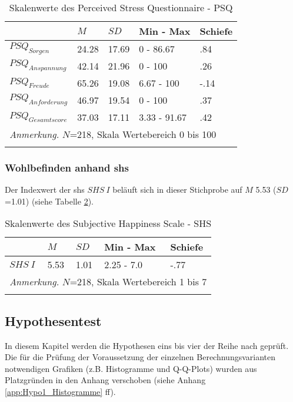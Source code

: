 \begin{table}[ht]
\begin{tabular}{m{6em} m{3em}  m{3em}  m{5em} m{3em}} 
  \hline
  & $M$ & $SD$ & Min - Max & Schiefe\\
  \hline
  $PSQ_{Sorgen}$ & 24.28 & 17.69 & 0 - 86.67 & .84 \\
  $PSQ_{Anspannung}$ & 42.14 & 21.96 & 0 - 100 & .26\\
  $PSQ_{Freude}$ & 65.26 & 19.08 & 6.67 - 100 & -.14\\
  $PSQ_{Anforderung}$ & 46.97 & 19.54 & 0 - 100 & .37 \\
  $PSQ_{Gesamtscore}$ & 37.03 & 17.11 & 3.33 - 91.67 & .42\\
  \hline
  \multicolumn{5}{l}{\textit{Anmerkung.} $N$=218, Skala Wertebereich 0 bis 100}\\
  &&&&\\
\end{tabular}
\caption{Skalenwerte des Perceived Stress Questionnaire - PSQ}
\label{table:PSQDeskriptiv}
\end{table}


\subsubsection{Wohlbefinden anhand \acrshort{shs}}
Der Indexwert der \acrfull{shs} $SHS~I$ beläuft sich in dieser Stichprobe auf $M$ 5.53 ($SD$=1.01) (siehe Tabelle \ref{table:SHSDeskriptiv}).

\begin{table}[ht]
\begin{tabular}{m{6em} m{3em}  m{3em}  m{5em} m{3em}} 
  \hline
  & $M$ & $SD$ & Min - Max & Schiefe\\
  \hline
  $SHS~I$ & 5.53 & 1.01 & 2.25 - 7.0 & -.77 \\
  \hline
  \multicolumn{5}{l}{\textit{Anmerkung.} $N$=218, Skala Wertebereich 1 bis 7}\\
  &&&&\\
\end{tabular}
\caption{Skalenwerte des Subjective Happiness Scale - SHS}
\label{table:SHSDeskriptiv}
\end{table}

\subsection{Hypothesentest} \label{sec:Hypothesentest}
In diesem Kapitel werden die Hypothesen eins bis vier der Reihe nach geprüft. Die für die Prüfung der Voraussetzung der einzelnen Berechnungsvarianten notwendigen Grafiken (z.B. Histogramme und Q-Q-Plots) wurden aus Platzgründen in den Anhang verschoben (siehe Anhang \ref{app:Hypo1_Histogramme} ff).

